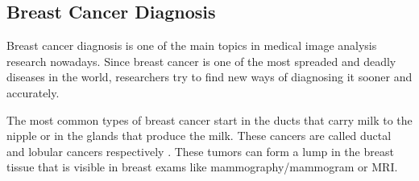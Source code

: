 \documentclass[
  twoside,
  11pt, a4paper,
  footinclude=true,
  headinclude=true,
  cleardoublepage=empty
]{scrbook}
\begin{document}
      \subsection{Breast Cancer Diagnosis} \label{background:medical-image:breast-cancer-diagnosis}
        Breast cancer diagnosis is one of the main topics in medical image analysis research nowadays. Since breast cancer is one of the most spreaded and deadly diseases in the world, researchers try to find new ways of diagnosing it sooner and accurately.

        The most common types of breast cancer start in the ducts that carry milk to the nipple or in the glands that produce the milk. These cancers are called ductal and lobular cancers respectively \cite{hunt2012diseases}. These tumors can form a lump in the breast tissue that is visible in breast exams like mammography/mammogram or MRI.
\end{document}

